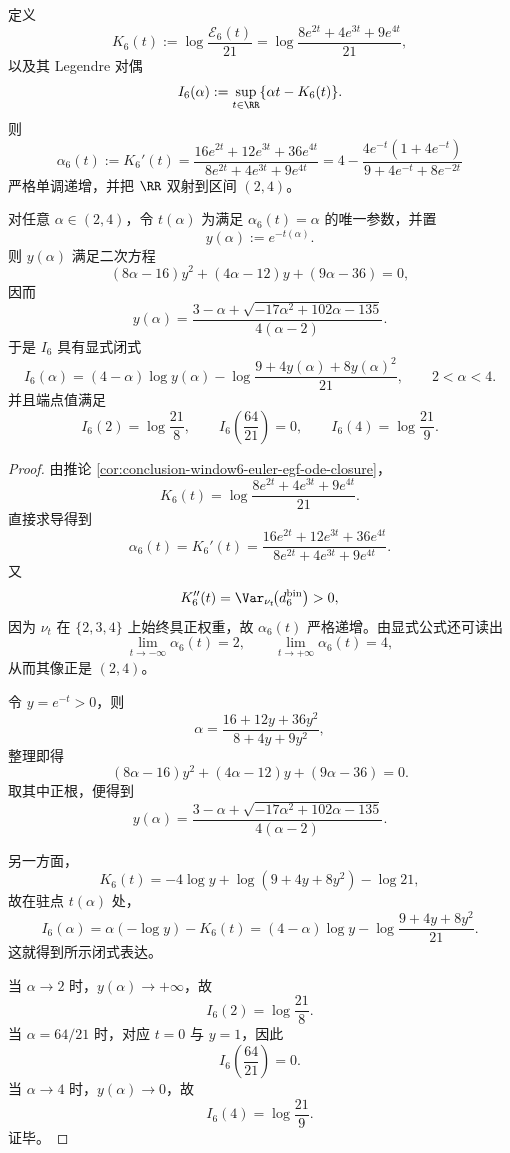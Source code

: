 \begin{theorem}\label{thm:conclusion-window6-escort-legendre-frontier-quadratic-algebraization}
定义
\[
K_6(t):=\log\frac{\mathcal E_6(t)}{21}
=\log\frac{8e^{2t}+4e^{3t}+9e^{4t}}{21},
\]
以及其 Legendre 对偶
\[
I_6(\alpha):=\sup_{t\in\RR}\{\alpha t-K_6(t)\}.
\]
则
\[
\alpha_6(t):=K_6'(t)
=\frac{16e^{2t}+12e^{3t}+36e^{4t}}{8e^{2t}+4e^{3t}+9e^{4t}}
=4-\frac{4e^{-t}(1+4e^{-t})}{9+4e^{-t}+8e^{-2t}}
\]
严格单调递增，并把 \(\RR\) 双射到区间 \((2,4)\)。

对任意 \(\alpha\in(2,4)\)，令 \(t(\alpha)\) 为满足 \(\alpha_6(t)=\alpha\) 的唯一参数，并置
\[
y(\alpha):=e^{-t(\alpha)}.
\]
则 \(y(\alpha)\) 满足二次方程
\[
(8\alpha-16)y^2+(4\alpha-12)y+(9\alpha-36)=0,
\]
因而
\[
y(\alpha)=\frac{3-\alpha+\sqrt{-17\alpha^2+102\alpha-135}}{4(\alpha-2)}.
\]
于是 \(I_6\) 具有显式闭式
\[
I_6(\alpha)
=(4-\alpha)\log y(\alpha)-\log\frac{9+4y(\alpha)+8y(\alpha)^2}{21},
\qquad 2<\alpha<4.
\]
并且端点值满足
\[
I_6(2)=\log\frac{21}{8},
\qquad
I_6\!\left(\frac{64}{21}\right)=0,
\qquad
I_6(4)=\log\frac{21}{9}.
\]
\end{theorem}

\begin{proof}
由推论 \ref{cor:conclusion-window6-euler-egf-ode-closure}，
\[
K_6(t)=\log\frac{8e^{2t}+4e^{3t}+9e^{4t}}{21}.
\]
直接求导得到
\[
\alpha_6(t)=K_6'(t)
=\frac{16e^{2t}+12e^{3t}+36e^{4t}}{8e^{2t}+4e^{3t}+9e^{4t}}.
\]
又
\[
K_6''(t)=\Var_{\nu_t}\!\bigl(d_6^{\mathrm{bin}}\bigr)>0,
\]
因为 \(\nu_t\) 在 \(\{2,3,4\}\) 上始终具正权重，故 \(\alpha_6(t)\) 严格递增。由显式公式还可读出
\[
\lim_{t\to-\infty}\alpha_6(t)=2,
\qquad
\lim_{t\to+\infty}\alpha_6(t)=4,
\]
从而其像正是 \((2,4)\)。

令 \(y=e^{-t}>0\)，则
\[
\alpha=\frac{16+12y+36y^2}{8+4y+9y^2},
\]
整理即得
\[
(8\alpha-16)y^2+(4\alpha-12)y+(9\alpha-36)=0.
\]
取其中正根，便得到
\[
y(\alpha)=\frac{3-\alpha+\sqrt{-17\alpha^2+102\alpha-135}}{4(\alpha-2)}.
\]

另一方面，
\[
K_6(t)=-4\log y+\log(9+4y+8y^2)-\log 21,
\]
故在驻点 \(t(\alpha)\) 处，
\[
I_6(\alpha)=\alpha(-\log y)-K_6(t)
=(4-\alpha)\log y-\log\frac{9+4y+8y^2}{21}.
\]
这就得到所示闭式表达。

当 \(\alpha\to 2\) 时，\(y(\alpha)\to+\infty\)，故
\[
I_6(2)=\log\frac{21}{8}.
\]
当 \(\alpha=64/21\) 时，对应 \(t=0\) 与 \(y=1\)，因此
\[
I_6\!\left(\frac{64}{21}\right)=0.
\]
当 \(\alpha\to 4\) 时，\(y(\alpha)\to 0\)，故
\[
I_6(4)=\log\frac{21}{9}.
\]
证毕。
\end{proof}

